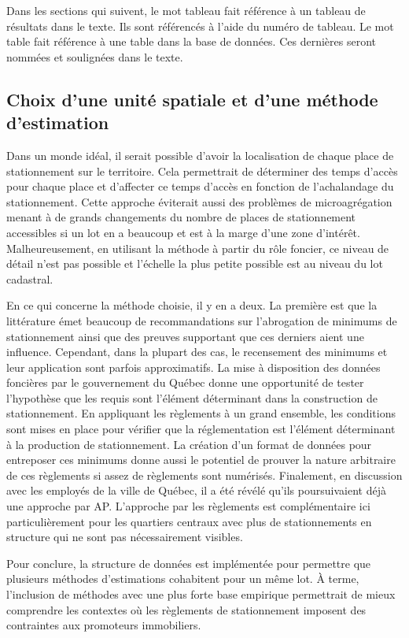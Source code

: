         Dans les sections qui suivent, le mot tableau fait référence à un tableau de résultats dans le texte. Ils sont référencés à l'aide du numéro de tableau. Le mot table fait référence à une table dans la base de données. Ces dernières seront nommées et soulignées dans le texte.\par
    
    \subsection{Choix d'une unité spatiale et d'une méthode d'estimation}\label{ssec:justif-ag-level-inventory}
        Dans un monde idéal, il serait possible d'avoir la localisation de chaque place de stationnement sur le territoire. Cela permettrait de déterminer des temps d'accès pour chaque place et d'affecter ce temps d'accès en fonction de l'achalandage du stationnement. Cette approche éviterait aussi des problèmes de microagrégation menant à de grands changements du nombre de places de stationnement accessibles si un lot en a beaucoup et est à la marge d'une zone d'intérêt. Malheureusement, en utilisant la méthode à partir du rôle foncier, ce niveau de détail n'est pas possible et l'échelle la plus petite possible est au niveau du lot cadastral.\par
        
        
        En ce qui concerne la méthode choisie, il y en a deux. La première est que la littérature émet beaucoup de recommandations sur l'abrogation de minimums de stationnement ainsi que des preuves supportant que ces derniers aient une influence. Cependant, dans la plupart des cas, le recensement des minimums et leur application sont parfois approximatifs. La mise à disposition des données foncières par le gouvernement du Québec donne une opportunité de tester l'hypothèse que les requis sont l'élément déterminant dans la construction de stationnement. En appliquant les règlements à un grand ensemble, les conditions sont mises en place pour vérifier que la réglementation est l'élément déterminant à la production de stationnement. La création d'un format de données pour entreposer ces minimums donne aussi le potentiel de prouver la nature arbitraire de ces règlements si assez de règlements sont numérisés. Finalement, en discussion avec les employés de la ville de Québec, il a été révélé qu'ils poursuivaient déjà une approche par \ac{AP}. L'approche par les règlements est complémentaire ici particulièrement pour les quartiers centraux avec plus de stationnements en structure qui ne sont pas nécessairement visibles. \par
        Pour conclure, la structure de données est implémentée pour permettre que plusieurs méthodes d'estimations cohabitent pour un même lot. À terme, l'inclusion de méthodes avec une plus forte base empirique permettrait de mieux comprendre les contextes où les règlements de stationnement imposent des contraintes aux promoteurs immobiliers.
    
